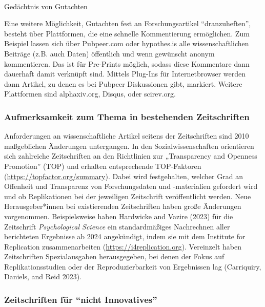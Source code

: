 \documentclass[
  letterpaper,
  DIV=11,
  numbers=noendperiod]{scrreprt}
\makeatletter
\let\oldparagraph\paragraph
\renewcommand{\paragraph}{
    \@ifstar
      \xxxParagraphStar
      \xxxParagraphNoStar
  }
\newcommand{\xxxParagraphStar}[1]{\oldparagraph*{#1}\mbox{}}
\newcommand{\xxxParagraphNoStar}[1]{\oldparagraph{#1}\mbox{}}
\makeatother
\begin{document}
\paragraph{Gedächtnis von Gutachten}\label{geduxe4chtnis-von-gutachten}

Eine weitere Möglichkeit, Gutachten fest an Forschungsartikel
``dranzuheften'', besteht über Plattformen, die eine schnelle
Kommentierung ermöglichen. Zum Beispiel lassen sich über Pubpeer.com
oder hypothes.is alle wissenschaftlichen Beiträge (z.B. auch Daten)
öffentlich und wenn gewünscht anonym kommentieren. Das ist für
Pre-Prints möglich, sodass diese Kommentare dann dauerhaft damit
verknüpft sind. Mittels Plug-Ins für Internetbrowser werden dann
Artikel, zu denen es bei Pubpeer Diskussionen gibt, markiert. Weitere
Plattformen sind alphaxiv.org, Disqus, oder scirev.org.

\subsubsection{Aufmerksamkeit zum Thema in bestehenden
Zeitschriften}\label{aufmerksamkeit-zum-thema-in-bestehenden-zeitschriften}

Anforderungen an wissenschaftliche Artikel seitens der Zeitschriften
sind 2010 maßgeblichen Änderungen untergangen. In den
Sozialwissenschaften orientieren sich zahlreiche Zeitschriften an den
Richtlinien zur „Transparency and Openness Promotion'' (TOP) und
erhalten entsprechende TOP-Faktoren
(\url{https://topfactor.org/summary}). Dabei wird festgehalten, welcher
Grad an Offenheit und Transparenz von Forschungsdaten und -materialien
gefordert wird und ob Replikationen bei der jeweiligen Zeitschrift
veröffentlicht werden. Neue Herausgeber*innen bei existierenden
Zeitschriften haben große Änderungen vorgenommen. Beispielsweise haben
Hardwicke and Vazire (2023) für die Zeitschrift \emph{Psychological
Science} ein standardmäßiges Nachrechnen aller berichteten Ergebnisse ab
2024 angekündigt, indem sie mit dem Institute for Replication
zusammenarbeiten (\url{https://i4replication.org}). Vereinzelt haben
Zeitschriften Spezialausgaben herausgegeben, bei denen der Fokus auf
Replikationsstudien oder der Reproduzierbarkeit von Ergebnissen lag
(Carriquiry, Daniels, and Reid 2023).

\subsubsection{Zeitschriften für ``nicht
Innovatives''}\label{zeitschriften-fuxfcr-nicht-innovatives}
\end{document}

